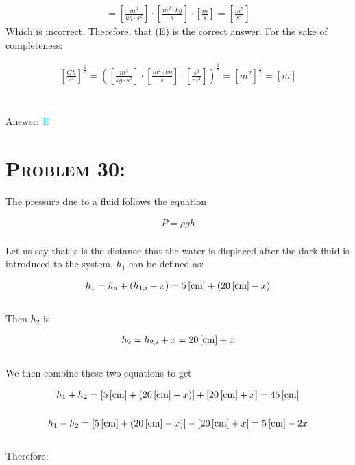 \documentclass{article}
\begin{document}
\begin{gather}
[G \hbar c] = \left[   \frac{m^{3}}{kg \cdot s^{2}}   \right] \cdot \left[   \frac{m^{2} \cdot kg}{s}   \right] \cdot \left[  \frac{m}{s} \right] = \left[   \frac{m^{5}}{s^{4}}   \right] \nonumber
\end{gather} Which is incorrect. Therefore, that (E) is the correct answer. For the sake of completeness:

\begin{gather}
\left[   \frac{G \hbar} {c^{3}}  \right]^{\frac{1}{2}}  =  \left(  \left[   \frac{m^{3}}{kg \cdot s^{2}}   \right] \cdot \left[   \frac{m^{2} \cdot kg}{s}   \right] \cdot \left[  \frac{s^{3}}{m^{3}} \right] \right)^{\frac{1}{2}}=\left[   m^{2}   \right]^\frac{1}{2} = [m] \nonumber
\end{gather}
\\\\
Answer: \textbf{\textcolor{cyan}E}\\


\section{\textsc{Problem 30:}} The pressure due to a fluid follows the equation

\begin{gather}
P = \rho g h
\end{gather}
\\
Let us say that $x$ is the distance that the water is displaced after the dark fluid is introduced to the system. $h_{1}$ can be defined as:

\begin{gather}
h_{1} = h_{d} + (h_{1,i} - x) = \unit[5]{[cm]} + (\unit[20]{[cm]} - x)\nonumber
\end{gather}
\\
Then $h_{2}$ is

\begin{gather}
h_{2} = h_{2,i} + x = \unit[20]{[cm]} + x \nonumber
\end{gather}
\\
We then combine these two equations to get

\begin{gather}
h_{1} + h_{2} =  [\unit[5]{[cm]} + (\unit[20]{[cm]} - x)] + [  \unit[20]{[cm]} + x ] = \unit[45]{[cm]}\nonumber\\
\nonumber\\
h_{1} - h_{2} =  [\unit[5]{[cm]} + (\unit[20]{[cm]} - x)] - [  \unit[20]{[cm]} + x ] = \unit[5]{[cm]} - 2x\nonumber
\end{gather}
\\
Therefore:
\end{document}
